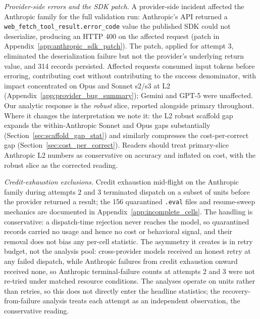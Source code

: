 \documentclass[10pt]{article} %
\begin{document}
    \textit{Provider-side errors and the SDK patch.} A provider-side incident affected the Anthropic family for the full validation run: Anthropic's API returned a \texttt{web\_fetch\_tool\_result.error\_code} value the published SDK could not deserialize, producing an HTTP 400 on the affected request (patch in Appendix~\ref{app:anthropic_sdk_patch}). The patch, applied for attempt 3, eliminated the deserialization failure but not the provider's underlying return value, and 314 records persisted. Affected requests consumed input tokens before erroring, contributing cost without contributing to the success denominator, with impact concentrated on Opus and Sonnet s2/s3 at L2 (Appendix~\ref{app:provider_bug_summary}); Gemini and GPT-5 were unaffected. Our analytic response is the \emph{robust} slice, reported alongside primary throughout. Where it changes the interpretation we note it: the L2 robust scaffold gap expands the within-Anthropic Sonnet and Opus gaps substantially (Section~\ref{sec:scaffold_gap_stat}) and similarly compresses the cost-per-correct gap (Section~\ref{sec:cost_per_correct}). Readers should treat primary-slice Anthropic L2 numbers as conservative on accuracy and inflated on cost, with the robust slice as the corrected reading.

    \textit{Credit-exhaustion exclusions.} Credit exhaustion mid-flight on the Anthropic family during attempts 2 and 3 terminated dispatch on a subset of units before the provider returned a result; the 156 quarantined \texttt{.eval} files and resume-sweep mechanics are documented in Appendix~\ref{app:incomplete_cells}. The handling is conservative: a dispatch-time rejection never reaches the model, so quarantined records carried no usage and hence no cost or behavioral signal, and their removal does not bias any per-cell statistic. The asymmetry it creates is in retry budget, not the analysis pool: cross-provider models received an honest retry at any failed dispatch, while Anthropic failures from credit exhaustion onward received none, so Anthropic terminal-failure counts at attempts 2 and 3 were not re-tried under matched resource conditions. The analyses operate on units rather than retries, so this does not directly enter the headline statistics; the recovery-from-failure analysis treats each attempt as an independent observation, the conservative reading.
\end{document}
